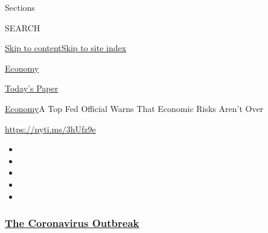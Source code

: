Sections

SEARCH

\protect\hyperlink{site-content}{Skip to
content}\protect\hyperlink{site-index}{Skip to site index}

\href{https://www.nytimes3xbfgragh.onion/section/business/economy}{Economy}

\href{https://myaccount.nytimes3xbfgragh.onion/auth/login?response_type=cookie\&client_id=vi}{}

\href{https://www.nytimes3xbfgragh.onion/section/todayspaper}{Today's
Paper}

\href{/section/business/economy}{Economy}\textbar{}A Top Fed Official
Warns That Economic Risks Aren't Over

\url{https://nyti.ms/3hUfz9e}

\begin{itemize}
\item
\item
\item
\item
\item
\end{itemize}

\hypertarget{the-coronavirus-outbreak}{%
\subsubsection{\texorpdfstring{\href{https://www.nytimes3xbfgragh.onion/news-event/coronavirus?name=styln-coronavirus-markets\&region=TOP_BANNER\&block=storyline_menu_recirc\&action=click\&pgtype=Article\&impression_id=08a3a190-f4b9-11ea-a720-afe8ca437054\&variant=undefined}{The
Coronavirus
Outbreak}}{The Coronavirus Outbreak}}\label{the-coronavirus-outbreak}}

